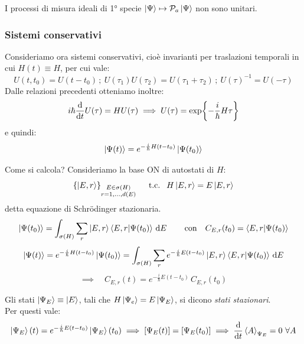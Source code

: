 \begin{attention}
    I processi di misura ideali di 1° specie \(\ket{\Psi}\mapsto \mathcal{P}_a\ket{\Psi}\) non sono unitari.
\end{attention}


\subsubsection{Sistemi conservativi}

Consideriamo ora sistemi conservativi, cioè invarianti per traslazioni temporali in cui \(H(t)\equiv H\), per cui vale:
\[
    U(t,t_0)= U(t-t_0)\,;\ U(\tau_1)U(\tau_2)= U(\tau_1+\tau_2)\,;\ U(\tau)^{-1}= U(-\tau)
\]
Dalle relazioni precedenti otteniamo inoltre:
\begin{equation}
    i\hbar \dv{t} U(\tau) = HU(\tau) \implies U(\tau)= \exp{-\frac{i}{\hbar}H \tau}
\end{equation}
e quindi:
\begin{equation}
    \ket{\Psi(t)}= e^{-\frac{i}{\hbar}H (t-t_0)}\ket{\Psi(t_0)}
\end{equation}

Come si calcola? Consideriamo la base ON di autostati di \(H\):
\[
    \left\{ \ket{E,r} \right\}_{\substack{E \in \sigma(H)\\ r = 1,\dots, d(E)}}  \quad \text{ t.c. }  \ H\ket{E,r}= E\ket{E,r}
\]
detta equazione di Schrödinger stazionaria.
\[
\ket{\Psi(t_0)} = \int_{\sigma(H)} \sum_r \ket{E,r}\braket{E,r}{\Psi(t_0)}\,\dd{E}
\qquad
\text{con} \quad C_{E,r}(t_0) = \braket{E,r}{\Psi(t_0)}
\]
\begin{equation}
    \ket{\Psi(t)} = e^{-\frac{i}{\hbar}H(t-t_0)}\ket{\Psi(t_0)}
    = \int_{\sigma(H)} \sum_r e^{-\frac{i}{\hbar}E(t-t_0)}\ket{E,r}\braket{E,r}{\Psi(t_0)}\,\dd{E}
\end{equation}
\begin{equation}
    \implies \quad C_{E,r}(t) = e^{-\frac{i}{\hbar}E(t-t_0)}\,C_{E,r}(t_0)
\end{equation}

\begin{definition}
    Gli stati \(\ket{\Psi_E}\equiv\ket{E}\), tali che \(H\ket{\Psi_e}= E\ket{\Psi_E}\), si dicono \textit{stati stazionari}.\\
    Per questi vale:
    \[
        \ket{\Psi_E}(t) = e^{-\frac{i}{\hbar}E(t-t_0)}\ket{\Psi_E}(t_0) \implies \left[ \Psi_E(t) \right] = \left[ \Psi_E(t_0) \right] 
        \implies \dv{t}\expval{A}_{\Psi_E}= 0 \ \forall A  
    \]
\end{definition}

